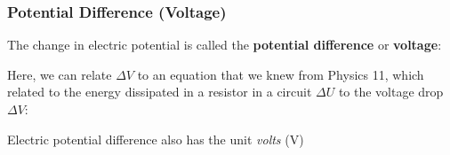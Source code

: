 \documentclass[12pt,aspectratio=169]{beamer}
\begin{document}
\begin{frame}
  \frametitle{Potential Difference (Voltage)}

  The change in electric potential is called the
  \textbf{potential difference} or \textbf{voltage}:


  Here, we can relate $\Delta V$ to an equation that we knew from Physics 11,
  which related to the energy dissipated in a resistor in a circuit
  $\Delta U$ to the voltage drop $\Delta V$:
    
  \vspace{-.2in}{\Large\[\boxed{\Delta U=q\Delta V}\]}

  Electric potential difference also has the unit \emph{volts} (\si{V})
\end{frame}
\end{document}
